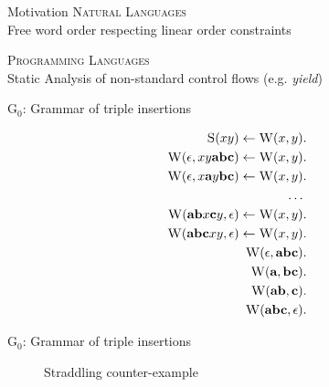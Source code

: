 \documentclass{beamer}
\newcommand\s{\textsc}
\newcommand\tsc[1]{\alert{\textsc{#1}}}
\begin{document}
	
	\begin{frame}{Motivation}
		\tsc{Natural Languages}\\
			Free word order respecting linear order constraints
		
		\pause 
				
		\tsc{Programming Languages}\\
			Static Analysis of non-standard control flows (e.g. \textit{yield})
	\end{frame}

	\begin{frame}{G$_0$: Grammar of triple insertions}
		\begin{figure}[h!]
		\begin{align}
		\setcounter{equation}{0}
		\s{S}(xy) \leftarrow \s{W}(x,y)&. \\
		\s{W}(\epsilon, xy\textbf{abc}) \leftarrow \s{W}(x,y)&. \\
		\s{W}(\epsilon, x\textbf{a}y\textbf{bc}) \leftarrow \s{W}(x,y)&. \\
		\dots \nonumber \\
		\setcounter{equation}{59}
		\s{W}(\textbf{ab}x\textbf{c}y, \epsilon) \leftarrow \s{W}(x,y)&. \\
		\s{W}(\textbf{abc}xy, \epsilon) \leftarrow \s{W}(x,y)&. \\
		\s{W}(\epsilon, \textbf{abc})&. \\
		\s{W}(\textbf{a}, \textbf{bc})&. \\
		\s{W}(\textbf{ab}, \textbf{c})&. \\
		\s{W}(\textbf{abc}, \epsilon)&.
		\end{align}
		\end{figure}
	\end{frame}

	\begin{frame}{G$_0$: Grammar of triple insertions}
		\begin{figure}[h!]
		\centering
		
		\caption*{Straddling counter-example}
		\end{figure}
	\end{frame}
\end{document}
